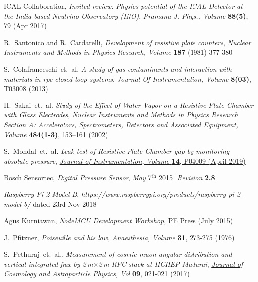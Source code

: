 \documentclass[a4paper,12pt,twoside]{article}
\begin{document}
\begin{thebibliography}{9}

  ICAL Collaboration,  \emph{Invited review: Physics potential of the ICAL Detector at the India-based Neutrino Observatory (INO)}, \emph{Pramana J. Phys., Volume } \textbf{88(5)}, 79 (Apr 2017)
  
  
  R.~Santonico and R.~Cardarelli, \emph{Development of resistive plate counters}, \emph{Nuclear Instruments and Methods in Physics Research, Volume} \textbf{187} (1981) 377-380

  S.~Colafranceschi~et.~al. \emph{A study of gas contaminants and interaction with materials in rpc closed loop systems}, \emph{Journal Of Instrumentation, Volume } \textbf{8(03)}, T03008 (2013)

  H.~Sakai~et.~al. \emph{Study of the Effect of Water Vapor on a Resistive Plate Chamber with Glass Electrodes}, \emph{Nuclear Instruments and Methods in Physics Research Section A: Accelerators, Spectrometers, Detectors and Associated Equipment, Volume } \textbf{484(1-3)}, 153--161 (2002)

  S.~Mondal~et.~al. \emph{Leak test of Resistive Plate Chamber gap by monitoring absolute pressure}, \href{https://doi.org/10.1088/1748-0221/14/04/P04009}{\emph{Journal of Instrumentation, Volume } \textbf{14}, P04009 (April 2019)}

  Bosch Sensortec, \emph{Digital Pressure Sensor}, \emph{May} 7$^\mathrm{th}$ 2015 [\emph{Revision} \textbf{2.8}]

  \emph{Raspberry Pi 2 Model B}, \emph{https://www.raspberrypi.org/products/raspberry-pi-2-model-b/} dated 23rd Nov 2018
    
  Agus Kurniawan, \emph{NodeMCU Development Workshop}, PE Press (July 2015)

  J.~Pfitzner, \emph{Poiseuille and his law}, \emph{Anaesthesia, Volume } \textbf{31}, 273-275 (1976)
  
  
  S.~Pethuraj~et.~al., \emph{Measurement of cosmic muon angular distribution and vertical integrated flux by 2\,m$\times$2\,m {RPC} stack at {IICHEP}-Madurai}, \href{https://doi.org/10.1088/1475-7516/2017/09/021}{\emph{Journal of Cosmology and Astroparticle Physics, Vol} \textbf{09}, 021-021 (2017)}
  

\end{thebibliography}
\end{document}
